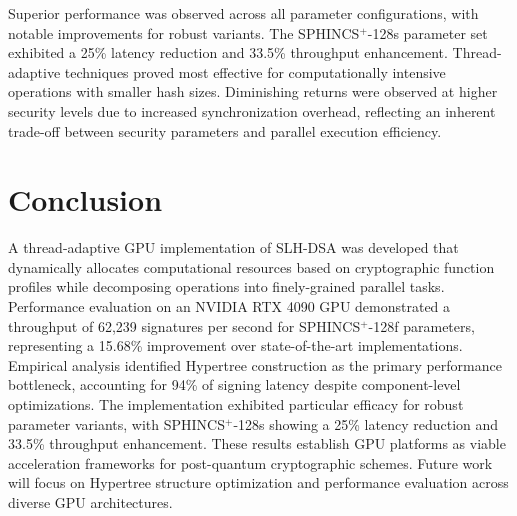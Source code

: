 \documentclass[journal]{IEEEtran}
\begin{document}
Superior performance was observed across all parameter configurations, with notable improvements for robust variants. The SPHINCS$^+$-128s parameter set exhibited a 25\% latency reduction and 33.5\% throughput enhancement. Thread-adaptive techniques proved most effective for computationally intensive operations with smaller hash sizes. Diminishing returns were observed at higher security levels due to increased synchronization overhead, reflecting an inherent trade-off between security parameters and parallel execution efficiency.

\section{Conclusion}\label{sec:conclusion}

A thread-adaptive GPU implementation of SLH-DSA was developed that dynamically allocates computational resources based on cryptographic function profiles while decomposing operations into finely-grained parallel tasks. Performance evaluation on an NVIDIA RTX 4090 GPU demonstrated a throughput of 62,239 signatures per second for SPHINCS$^+$-128f parameters, representing a 15.68\% improvement over state-of-the-art implementations. Empirical analysis identified Hypertree construction as the primary performance bottleneck, accounting for 94\% of signing latency despite component-level optimizations. The implementation exhibited particular efficacy for robust parameter variants, with SPHINCS$^+$-128s showing a 25\% latency reduction and 33.5\% throughput enhancement. These results establish GPU platforms as viable acceleration frameworks for post-quantum cryptographic schemes. Future work will focus on Hypertree structure optimization and performance evaluation across diverse GPU architectures.


\end{document}
